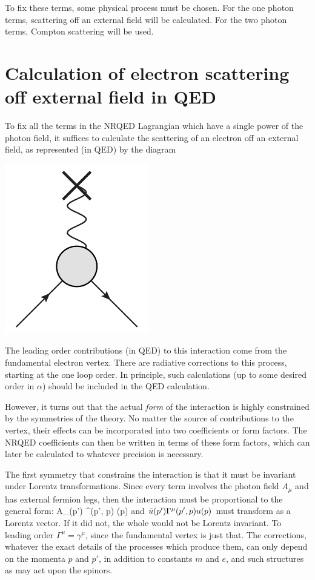 To fix these terms, some physical process must be chosen.  For the one photon terms, scattering off an external field will be calculated.  For the two photon terms, Compton scattering will be used.

\section{Calculation of electron scattering off external field in QED}
To fix all the terms in the NRQED Lagrangian which have a single power of the photon field, it suffices to calculate the scattering of an electron off an external field, as represented (in QED) by the diagram

   \includegraphics[scale=0.8]{eps/blob-wave} 


The leading order contributions (in QED) to this interaction come from the fundamental electron vertex.  There are radiative corrections to this process, starting at the one loop order.  In principle, such calculations (up to some desired order in $\alpha$) should be included in the QED calculation.  

However, it turns out that the actual {\it form} of the interaction is highly constrained by the symmetries of the theory.  No matter the source of contributions to the vertex, their effects can be incorporated into two coefficients or form factors.  The NRQED coefficients can then be written in terms of these form factors, which can later be calculated to whatever precision is necessary.  

The first symmetry that constrains the interaction is that it must be invariant under Lorentz transformations.  Since every term involves the photon field $A_\mu$ and has external fermion legs, then the interaction must be proportional to the general form:
\beq
	A_\mu \srb(p') \Gamma^\mu(p', p) \sr(p) 
\eeq 	
and $\bar{u}(p') \Gamma^\mu(p', p) u(p) $ must transform as a Lorentz vector.  If it did not, the whole would not be Lorentz invariant.  To leading order $\Gamma^\mu = \gamma^\mu$, since the fundamental vertex is just that.  The corrections, whatever the exact details of the processes which produce them, can only depend on the momenta $p$ and $p'$, in addition to constants $m$ and $e$, and such structures as may act upon the spinors.

